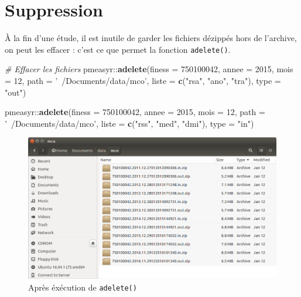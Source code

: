 \documentclass[]{book}
\newenvironment{Shaded}{\begin{snugshade}}{\end{snugshade}}
\newcommand{\KeywordTok}[1]{\textcolor[rgb]{0.13,0.29,0.53}{\textbf{{#1}}}}
\newcommand{\DataTypeTok}[1]{\textcolor[rgb]{0.13,0.29,0.53}{{#1}}}
\newcommand{\DecValTok}[1]{\textcolor[rgb]{0.00,0.00,0.81}{{#1}}}
\newcommand{\StringTok}[1]{\textcolor[rgb]{0.31,0.60,0.02}{{#1}}}
\newcommand{\CommentTok}[1]{\textcolor[rgb]{0.56,0.35,0.01}{\textit{{#1}}}}
\newcommand{\NormalTok}[1]{{#1}}
\begin{document}
\section{Suppression}\label{suppression}

À la fin d'une étude, il est inutile de garder les fichiers dézippés
hors de l'archive, on peut les effacer : c'est ce que permet la fonction
\texttt{adelete()}.

\begin{Shaded}
\begin{Highlighting}[]
\CommentTok{# Effacer les fichiers}
\NormalTok{pmeasyr::}\KeywordTok{adelete}\NormalTok{(}\DataTypeTok{finess =} \DecValTok{750100042}\NormalTok{, }
                 \DataTypeTok{annee =} \DecValTok{2015}\NormalTok{, }
                 \DataTypeTok{mois =} \DecValTok{12}\NormalTok{, }
                 \DataTypeTok{path =} \StringTok{'~/Documents/data/mco'}\NormalTok{, }
                 \DataTypeTok{liste =} \KeywordTok{c}\NormalTok{(}\StringTok{"rsa"}\NormalTok{, }\StringTok{"ano"}\NormalTok{, }\StringTok{"tra"}\NormalTok{), }
                 \DataTypeTok{type =} \StringTok{"out"}\NormalTok{)}

\NormalTok{pmeasyr::}\KeywordTok{adelete}\NormalTok{(}\DataTypeTok{finess =} \DecValTok{750100042}\NormalTok{, }
                 \DataTypeTok{annee =} \DecValTok{2015}\NormalTok{, }
                 \DataTypeTok{mois =} \DecValTok{12}\NormalTok{, }
                 \DataTypeTok{path =} \StringTok{'~/Documents/data/mco'}\NormalTok{, }
                 \DataTypeTok{liste =} \KeywordTok{c}\NormalTok{(}\StringTok{"rss"}\NormalTok{, }\StringTok{"med"}\NormalTok{, }\StringTok{"dmi"}\NormalTok{), }
                 \DataTypeTok{type =} \StringTok{"in"}\NormalTok{)}
\end{Highlighting}
\end{Shaded}

\begin{figure}[htbp]
\centering
\includegraphics{images/archives_mco.png}
\caption{Après éxécution de \texttt{adelete()}}
\end{figure}
\end{document}
